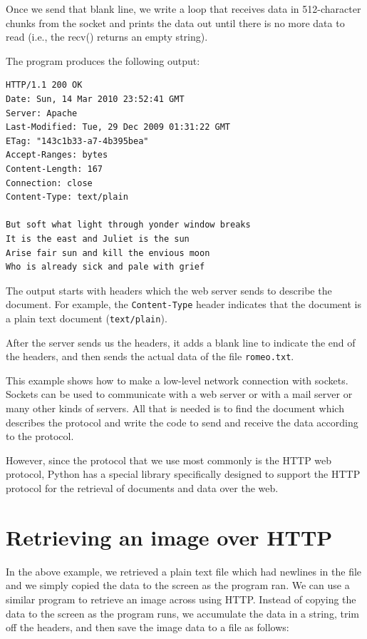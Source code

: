 Once we send that blank line, we write a loop that receives data 
in 512-character chunks from the socket and prints the data out 
until there is no more data to read (i.e., the recv() returns 
an empty string).

The program produces the following output:

\beforeverb
\begin{verbatim}
HTTP/1.1 200 OK
Date: Sun, 14 Mar 2010 23:52:41 GMT
Server: Apache
Last-Modified: Tue, 29 Dec 2009 01:31:22 GMT
ETag: "143c1b33-a7-4b395bea"
Accept-Ranges: bytes
Content-Length: 167
Connection: close
Content-Type: text/plain

But soft what light through yonder window breaks
It is the east and Juliet is the sun
Arise fair sun and kill the envious moon
Who is already sick and pale with grief
\end{verbatim}
\afterverb
%
The output starts with headers which the web server sends
to describe the document.
For example, the {\tt Content-Type} header indicates that
the document is a plain text document ({\tt text/plain}).

After the server sends us the headers, it adds a blank line
to indicate the end of the headers, and then sends the actual
data of the file {\tt romeo.txt}.

This example shows how to make a low-level network connection
with sockets.   Sockets can be used to communicate with a web
server or with a mail server or many other kinds of servers.
All that is needed is to find the document which describes
the protocol and write the code to send and receive the data
according to the protocol.

However, since the protocol that we use most commonly is
the HTTP web protocol, Python has a special 
library specifically designed to support the HTTP protocol 
for the retrieval of documents and data over the web.

\section{Retrieving an image over HTTP}

In the above example, we retrieved a plain text file 
which had newlines in the file and we simply copied the
data to the screen as the program ran.   We can use a similar
program to retrieve an image across using HTTP.   Instead
of copying the data to the screen as the program runs,
we accumulate the data in a string, trim off the headers,
and then save the image data to a file as follows:

